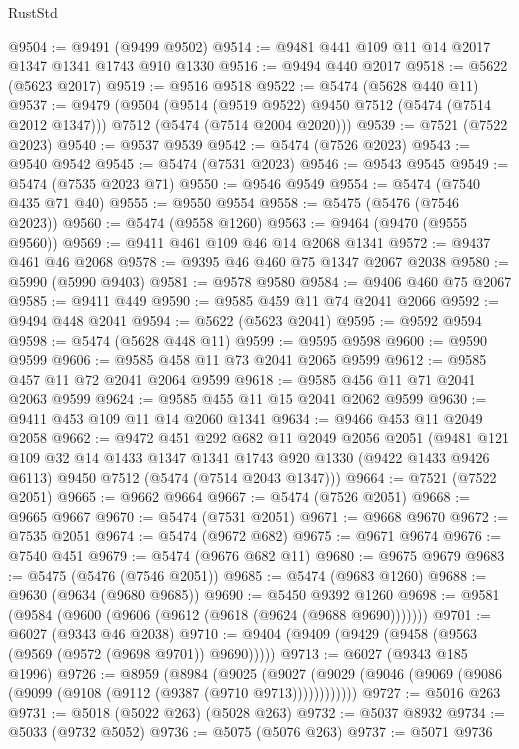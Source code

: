 \begin{lexlean}{RustStd}
\begin{coremodule}
@9504 := @9491 (@9499 @9502)
@9514 := @9481 @441 @109 @11 @14 @2017 @1347 @1341 @1743 @910 @1330
@9516 := @9494 @440 @2017
@9518 := @5622 (@5623 @2017)
@9519 := @9516 @9518
@9522 := @5474 (@5628 @440 @11)
@9537 := @9479
    (@9504
      (@9514 (@9519 @9522) @9450 @7512 (@5474 (@7514 @2012 @1347)))
      @7512
      (@5474 (@7514 @2004 @2020)))
@9539 := @7521 (@7522 @2023)
@9540 := @9537 @9539
@9542 := @5474 (@7526 @2023)
@9543 := @9540 @9542
@9545 := @5474 (@7531 @2023)
@9546 := @9543 @9545
@9549 := @5474 (@7535 @2023 @71)
@9550 := @9546 @9549
@9554 := @5474 (@7540 @435 @71 @40)
@9555 := @9550 @9554
@9558 := @5475 (@5476 (@7546 @2023))
@9560 := @5474 (@9558 @1260)
@9563 := @9464 (@9470 (@9555 @9560))
@9569 := @9411 @461 @109 @46 @14 @2068 @1341
@9572 := @9437 @461 @46 @2068
@9578 := @9395 @46 @460 @75 @1347 @2067 @2038
@9580 := @5990 (@5990 @9403)
@9581 := @9578 @9580
@9584 := @9406 @460 @75 @2067
@9585 := @9411 @449
@9590 := @9585 @459 @11 @74 @2041 @2066
@9592 := @9494 @448 @2041
@9594 := @5622 (@5623 @2041)
@9595 := @9592 @9594
@9598 := @5474 (@5628 @448 @11)
@9599 := @9595 @9598
@9600 := @9590 @9599
@9606 := @9585 @458 @11 @73 @2041 @2065 @9599
@9612 := @9585 @457 @11 @72 @2041 @2064 @9599
@9618 := @9585 @456 @11 @71 @2041 @2063 @9599
@9624 := @9585 @455 @11 @15 @2041 @2062 @9599
@9630 := @9411 @453 @109 @11 @14 @2060 @1341
@9634 := @9466 @453 @11 @2049 @2058
@9662 := @9472
    @451
    @292
    @682
    @11
    @2049
    @2056
    @2051
    (@9481
      @121
      @109
      @32
      @14
      @1433
      @1347
      @1341
      @1743
      @920
      @1330
      (@9422 @1433 @9426 @6113)
      @9450
      @7512
      (@5474 (@7514 @2043 @1347)))
@9664 := @7521 (@7522 @2051)
@9665 := @9662 @9664
@9667 := @5474 (@7526 @2051)
@9668 := @9665 @9667
@9670 := @5474 (@7531 @2051)
@9671 := @9668 @9670
@9672 := @7535 @2051
@9674 := @5474 (@9672 @682)
@9675 := @9671 @9674
@9676 := @7540 @451
@9679 := @5474 (@9676 @682 @11)
@9680 := @9675 @9679
@9683 := @5475 (@5476 (@7546 @2051))
@9685 := @5474 (@9683 @1260)
@9688 := @9630 (@9634 (@9680 @9685))
@9690 := @5450 @9392 @1260
@9698 := @9581 (@9584 (@9600 (@9606 (@9612 (@9618 (@9624 (@9688 @9690)))))))
@9701 := @6027 (@9343 @46 @2038)
@9710 := @9404 (@9409 (@9429 (@9458 (@9563 (@9569 (@9572 (@9698 @9701)) @9690)))))
@9713 := @6027 (@9343 @185 @1996)
@9726 := @8959
    (@8984
      (@9025 (@9027 (@9029 (@9046 (@9069 (@9086 (@9099 (@9108 (@9112 (@9387 (@9710 @9713))))))))))))
@9727 := @5016 @263
@9731 := @5018 (@5022 @263) (@5028 @263)
@9732 := @5037 @8932
@9734 := @5033 (@9732 @5052)
@9736 := @5075 (@5076 @263)
@9737 := @5071 @9736

\end{coremodule}
\end{lexlean}
